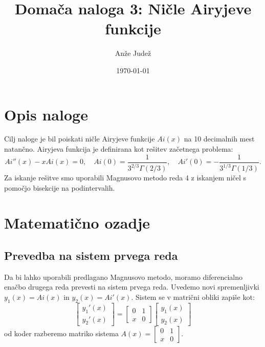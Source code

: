 \documentclass[11pt, a4paper]{article}
\title{Domača naloga 3: Ničle Airyjeve funkcije}
\author{Anže Judež}
\date{\today}
\begin{document}
\maketitle

\section{Opis naloge}
Cilj naloge je bil poiskati ničle Airyjeve funkcije $Ai(x)$ na 10 decimalnih mest natančno\cite{textbook}. Airyjeva funkcija je definirana kot rešitev začetnega problema:
\begin{equation}
    Ai''(x) - x Ai(x) = 0, \quad Ai(0) = \frac{1}{3^{2/3} \Gamma(2/3)}, \quad Ai'(0) = -\frac{1}{3^{1/3} \Gamma(1/3)}.
\end{equation}
Za iskanje rešitve smo uporabili Magnusovo metodo reda 4 z iskanjem ničel s pomočjo bisekcije na podintervalih\cite{magnus1954, orel2004}.

\section{Matematično ozadje}
\subsection{Prevedba na sistem prvega reda}
Da bi lahko uporabili predlagano Magnusovo metodo, moramo diferencialno enačbo drugega reda prevesti na sistem prvega reda. Uvedemo novi spremenljivki $y_1(x) = Ai(x)$ in $y_2(x) = Ai'(x)$. Sistem se v matrični obliki zapiše kot:
\begin{equation}
    \begin{bmatrix} y_1'(x) \\ y_2'(x) \end{bmatrix} = \begin{bmatrix} 0 & 1 \\ x & 0 \end{bmatrix} \begin{bmatrix} y_1(x) \\ y_2(x) \end{bmatrix}
\end{equation}
od koder razberemo matriko sistema $A(x) = \begin{bmatrix} 0 & 1 \\ x & 0 \end{bmatrix}$.
\end{document}
